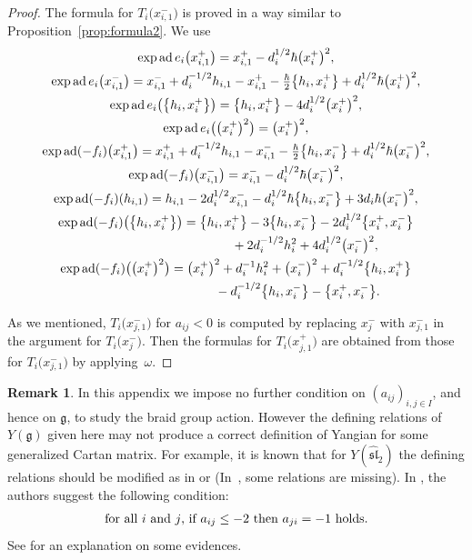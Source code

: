 \documentclass[pdftex]{sigma}
\theoremstyle{definition}
\newtheorem{rem}[thm]{Remark}
\numberwithin{equation}{section}
\DeclareMathOperator{\ad}{ad}
\newcommand{\frakg}{\mathfrak{g}}
\begin{document}
\begin{proof}
The formula for $T_i\big(x_{i,1}^-\big)$ is proved in a way similar to Proposition~\ref{prop:formula2}. We use
\begin{gather*}
\exp\ad e_i\big(x_{i,1}^+\big) = x_{i,1}^+ - d_i^{1/2} \hbar \big(x_i^+\big)^2, \\
\exp\ad e_i \big(x_{i,1}^-\big) = x_{i,1}^- + d_i^{-1/2} h_{i,1} - x_{i,1}^+ - \tfrac{\hbar}{2}\big\{h_i,x_i^+\big\} + d_i^{1/2} \hbar \big(x_i^+\big)^2, \\
\exp\ad e_i \big(\big\{h_i,x_i^+\big\}\big) = \big\{h_i,x_i^+\big\} - 4d_i^{1/2}\big(x_i^+\big)^2, \\
\exp\ad e_i \big(\big(x_i^+\big)^2\big) = \big(x_i^+\big)^2,
\\
\exp\ad (-f_i)\big(x_{i,1}^+\big)= x_{i,1}^+ + d_i^{-1/2} h_{i,1} - x_{i,1}^- - \tfrac{\hbar}{2}\big\{h_i,x_i^-\big\} + d_i^{1/2} \hbar \big(x_i^-\big)^2, \\
\exp\ad (-f_i)\big(x_{i,1}^-\big) = x_{i,1}^- - d_i^{1/2} \hbar \big(x_i^-\big)^2, \\
\exp\ad (-f_i)(h_{i,1}) = h_{i,1} - 2 d_i^{1/2} x_{i,1}^- - d_i^{1/2} \hbar \big\{h_i,x_i^-\big\} + 3 d_i \hbar \big(x_i^-\big)^2, \\
\exp\ad (-f_i)\big(\big\{h_{i},x_i^+\big\}\big) = \big\{h_i,x_i^+\big\} - 3 \big\{h_i,x_i^-\big\} - 2d_i^{1/2}\big\{x_i^+,x_i^-\big\} \\
\hphantom{\exp\ad (-f_i)\big(\big\{h_{i},x_i^+\big\}\big) =}{} + 2d_i^{-1/2} h_i^2 + 4d_i^{1/2}\big(x_i^-\big)^2, \\
\exp\ad (-f_i)\big(\big(x_i^+\big)^2\big) = \big(x_i^+\big)^2 + d_i^{-1} h_i^2 + \big(x_i^-\big)^2 + d_i^{-1/2} \big\{h_i,x_i^+\big\} \\
\hphantom{\exp\ad (-f_i)\big(\big(x_i^+\big)^2\big) =}{} - d_i^{-1/2} \big\{h_i,x_i^-\big\} - \big\{x_i^+,x_i^-\big\}.
\end{gather*}

As we mentioned, $T_i\big(x_{j,1}^-\big)$ for $a_{ij}<0$ is computed by replacing $x_j^-$ with $x_{j,1}^-$ in the argument for $T_i\big(x_{j}^-\big)$. Then the formulas for $T_i\big(x_{j,1}^+\big)$ are obtained from those for $T_i\big(x_{j,1}^-\big)$ by applying~$\omega$.
\end{proof}

\begin{rem} In this appendix we impose no further condition on $(a_{ij})_{i,j \in I}$, and hence on $\frakg$, to study the braid group action. However the defining relations of $Y(\frakg)$ given here may not produce a correct definition of Yangian for some generalized Cartan matrix. For example, it is known that for $Y(\hat{\mathfrak{sl}}_2)$ the defining relations should be modified as in \cite[Definition~5.1]{MR3898327} or \cite[Section~1.2]{MR3850574} (In~\cite{MR3898327}, some relations are missing). In \cite[equation~(2.1)]{GRW}, the authors suggest the following condition:
\begin{gather*}
\text{for all $i$ and $ j$, if $a_{ij} \leq -2$ then $a_{ji}=-1$ holds}.
\end{gather*}
See \cite[Section~2, Lemma~4.2, Remark~5.15]{GRW} for an explanation on some evidences.
\end{rem}
\end{document}
